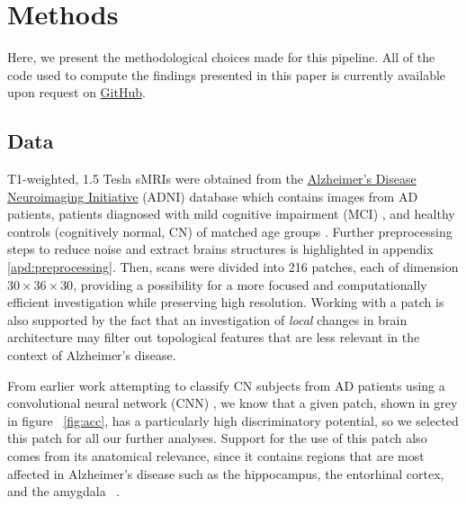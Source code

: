 \documentclass{article}
\begin{document}
\section{Methods}\label{sec:methods}

Here, we present the methodological choices made for this pipeline. All of the code used to compute
the findings presented in this paper is currently available upon request on
\href{https://github.com/BorgwardtLab/ADNI_MRI_Analysis}{GitHub}.

\subsection{Data}

T1-weighted, 1.5 Tesla sMRIs were obtained from the \href{adni.loni.usc.edu}{Alzheimer's Disease
  Neuroimaging Initiative} (ADNI) database which contains images from AD patients, patients
diagnosed with mild cognitive impairment (MCI) \citep{gauthier2006mild}, and healthy controls
(cognitively normal, CN) of matched age groups \citep{jack2008alzheimer}. Further preprocessing
steps to reduce noise and extract brains structures is highlighted in appendix
\ref{apd:preprocessing}. Then, scans were divided into 216 patches, each of dimension
$30\times36\times30$, providing a possibility for a more focused and computationally efficient
investigation while preserving high resolution. Working with a patch is also supported by the fact
that an investigation of \emph{local} changes in brain architecture may filter out topological
features that are less relevant in the context of Alzheimer's disease.

From earlier work attempting to classify CN subjects from AD patients using a convolutional neural
network (CNN) \citep{bruningk2020image}, we know that a given patch, shown in grey in figure
~\ref{fig:acc}, has a particularly high discriminatory potential, so we selected this patch for all
our further analyses. Support for the use of this patch also comes from its anatomical relevance,
since it contains regions that are most affected in Alzheimer's disease such as the
hippocampus, the entorhinal cortex, and the amygdala ~\citep{goedert2006century}.
\end{document}
